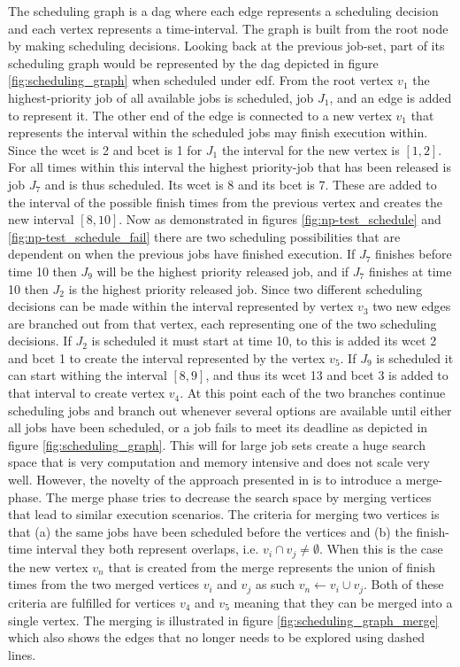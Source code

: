 \documentclass{kththesis}
\begin{document}
The scheduling graph is a \acrshort{dag} where each edge represents a scheduling decision and each
vertex represents a time-interval. The graph is built from the root node by making scheduling
decisions. Looking back at the previous job-set, part of its scheduling graph would be represented
by the \acrshort{dag} depicted in figure \ref{fig:scheduling_graph} when scheduled under
\acrshort{edf}. From the root vertex $v_1$ the highest-priority job of all available jobs is
scheduled, job $J_1$, and an edge is added to represent it. The other end of the edge is connected
to a new vertex $v_1$ that represents the interval within the scheduled jobs may finish execution
within. Since the \acrshort{wcet} is 2 and \acrshort{bcet} is 1 for $J_1$ the interval for the new
vertex is $[1, 2]$.  For all times within this interval the highest priority-job that has been
released is job $J_7$ and is thus scheduled.  Its \acrshort{wcet} is 8 and its \acrshort{bcet} is 7.
These are added to the interval of the possible finish times from the previous vertex and creates
the new interval $[8,10]$. Now as demonstrated in figures \ref{fig:np-test_schedule} and
\ref{fig:np-test_schedule_fail} there are two scheduling possibilities that are dependent on when
the previous jobs have finished execution. If $J_7$ finishes before time 10 then $J_9$ will be the
highest priority released job, and if $J_7$ finishes at time 10 then $J_2$ is the highest priority
released job. Since two different scheduling decisions can be made within the interval represented
by vertex $v_3$ two new edges are branched out from that vertex, each representing one of the two
scheduling decisions. If $J_2$ is scheduled it must start at time 10, to this is added its
\acrshort{wcet} 2 and \acrshort{bcet} 1 to create the interval represented by the vertex $v_5$. If
$J_9$ is scheduled it can start withing the interval $[8, 9]$, and thus its \acrshort{wcet} 13 and
\acrshort{bcet} 3 is added to that interval to create vertex $v_4$. At this point each of the two
branches continue scheduling jobs and branch out whenever several options are available until either
all jobs have been scheduled, or a job fails to meet its deadline as depicted in figure
\ref{fig:scheduling_graph}. This will for large job sets create a huge search space that is very
computation and memory intensive and does not scale very well. However, the novelty of the approach
presented in \parencite{nasri_exact_2017} is to introduce a merge-phase. The merge phase tries to
decrease the search space by merging vertices that lead to similar execution scenarios. The
criteria for merging two vertices is that (a) the same jobs have been scheduled before the vertices
and (b) the finish-time interval they both represent overlaps, i.e. $v_i \cap v_j \neq \emptyset$.
When this is the case the new vertex $v_n$ that is created from the merge represents the union of
finish times from the two merged vertices $v_i$ and $v_j$ as such $v_n \gets v_i \cup v_j$. Both of
these criteria are fulfilled for vertices $v_4$ and $v_5$ meaning that they can be merged into a
single vertex. The merging is illustrated in figure \ref{fig:scheduling_graph_merge} which also
shows the edges that no longer needs to be explored using dashed lines.
\end{document}

